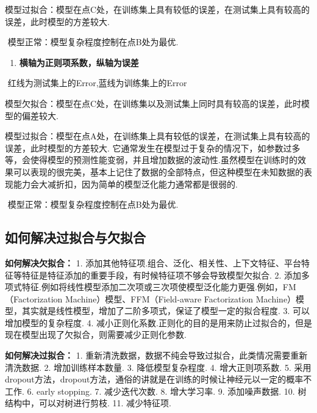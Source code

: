 ​
模型过拟合：模型在点C处，在训练集上具有较低的误差，在测试集上具有较高的误差，此时模型的方差较大.

​ 模型正常：模型复杂程度控制在点B处为最优.

\begin{enumerate}
\def\labelenumi{\arabic{enumi}.}
\setcounter{enumi}{2}
\item
  \textbf{横轴为正则项系数，纵轴为误差}
\end{enumerate}


​ 红线为测试集上的Error,蓝线为训练集上的Error

​
模型欠拟合：模型在点C处，在训练集以及测试集上同时具有较高的误差，此时模型的偏差较大.

​
模型过拟合：模型在点A处，在训练集上具有较低的误差，在测试集上具有较高的误差，此时模型的方差较大.
它通常发生在模型过于复杂的情况下，如参数过多等，会使得模型的预测性能变弱，并且增加数据的波动性.虽然模型在训练时的效果可以表现的很完美，基本上记住了数据的全部特点，但这种模型在未知数据的表现能力会大减折扣，因为简单的模型泛化能力通常都是很弱的.

​ 模型正常：模型复杂程度控制在点B处为最优.

\subsection{如何解决过拟合与欠拟合}\label{ux5982ux4f55ux89e3ux51b3ux8fc7ux62dfux5408ux4e0eux6b20ux62dfux5408}

\textbf{如何解决欠拟合：} 1.
添加其他特征项.组合、泛化、相关性、上下文特征、平台特征等特征是特征添加的重要手段，有时候特征项不够会导致模型欠拟合.
2.
添加多项式特征.例如将线性模型添加二次项或三次项使模型泛化能力更强.例如，FM（Factorization
Machine）模型、FFM（Field-aware Factorization
Machine）模型，其实就是线性模型，增加了二阶多项式，保证了模型一定的拟合程度.
3. 可以增加模型的复杂程度. 4.
减小正则化系数.正则化的目的是用来防止过拟合的，但是现在模型出现了欠拟合，则需要减少正则化参数.

\textbf{如何解决过拟合：} 1.
重新清洗数据，数据不纯会导致过拟合，此类情况需要重新清洗数据. 2.
增加训练样本数量. 3. 降低模型复杂程度. 4. 增大正则项系数. 5.
采用dropout方法，dropout方法，通俗的讲就是在训练的时候让神经元以一定的概率不工作.
6. early stopping. 7. 减少迭代次数. 8. 增大学习率. 9. 添加噪声数据.
10. 树结构中，可以对树进行剪枝. 11. 减少特征项.

